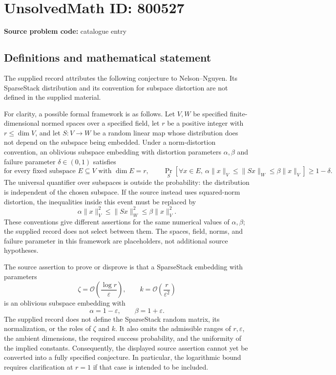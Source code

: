 \documentclass[11pt]{article}
\begin{document}
\section*{UnsolvedMath ID: 800527}
\textbf{Source problem code:} catalogue entry
\subsection{Definitions and mathematical statement}
The supplied record attributes the following conjecture to Nelson--Nguyen. Its SparseStack distribution and its convention for subspace distortion are not defined in the supplied material.

For clarity, a possible formal framework is as follows. Let \(V,W\) be specified finite-dimensional normed spaces over a specified field, let \(r\) be a positive integer with \(r\leq\dim V\), and let \(S:V\to W\) be a random linear map whose distribution does not depend on the subspace being embedded. Under a norm-distortion convention, an oblivious subspace embedding with distortion parameters \(\alpha,\beta\) and failure parameter \(\delta\in(0,1)\) satisfies
\[
\text{for every fixed subspace }E\subseteq V\text{ with }\dim E=r,\qquad
\Pr_S\!\left[\forall x\in E,\ \alpha\lVert x\rVert_V\leq\lVert Sx\rVert_W\leq\beta\lVert x\rVert_V\right]\geq 1-\delta.
\]
The universal quantifier over subspaces is outside the probability: the distribution is independent of the chosen subspace. If the source instead uses squared-norm distortion, the inequalities inside this event must be replaced by
\[
\alpha\lVert x\rVert_V^2\leq\lVert Sx\rVert_W^2\leq\beta\lVert x\rVert_V^2.
\]
These conventions give different assertions for the same numerical values of \(\alpha,\beta\); the supplied record does not select between them. The spaces, field, norms, and failure parameter in this framework are placeholders, not additional source hypotheses.

The source assertion to prove or disprove is that a SparseStack embedding with parameters
\[
\zeta=\mathcal O\!\left(\frac{\log r}{\varepsilon}\right),\qquad
k=\mathcal O\!\left(\frac{r}{\varepsilon^2}\right)
\]
is an oblivious subspace embedding with
\[
\alpha=1-\varepsilon,\qquad \beta=1+\varepsilon.
\]
The supplied record does not define the SparseStack random matrix, its normalization, or the roles of \(\zeta\) and \(k\). It also omits the admissible ranges of \(r,\varepsilon\), the ambient dimensions, the required success probability, and the uniformity of the implied constants. Consequently, the displayed source assertion cannot yet be converted into a fully specified conjecture. In particular, the logarithmic bound requires clarification at \(r=1\) if that case is intended to be included.
\end{document}
